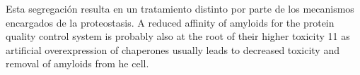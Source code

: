 Esta segregación resulta en un tratamiento distinto por parte de los mecanismos encargados de la proteostasis.
A reduced affinity of amyloids for the protein quality control system is probably also at the root of their higher toxicity 11 as artificial overexpression of chaperones
usually leads to decreased toxicity and removal of amyloids from he cell.





% 




